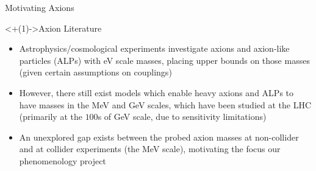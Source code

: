 \documentclass[]{beamer}
\begin{document}
\begin{frame}{Motivating Axions}
\begin{block}
\begin{itemize}[<+(1)->]
        \end{itemize}
    \end{block}
    \begin{block}<+(1)->{Axion Literature}
        \begin{itemize}[<+(1)->]
            \item Astrophysics/cosmological experiments investigate axions and axion-like particles (ALPs) with eV scale masses, placing upper bounds on those masses (given certain assumptions on couplings)
            \item However, there still exist models which enable heavy axions and ALPs to have masses in the MeV and GeV scales, which have been studied at the LHC (primarily at the $100$s of GeV scale, due to sensitivity limitations)
            \item An unexplored gap exists between the probed axion masses at non-collider and at collider experiments (the MeV scale), motivating the focus our phenomenology project
        \end{itemize}
    \end{block}
\end{frame}
\end{document}

